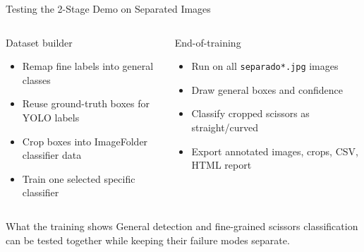 \documentclass[10pt,aspectratio=169]{beamer}
\begin{document}
\begin{frame}{Testing the 2-Stage Demo on Separated Images}
  \begin{columns}[T]
    \begin{block}{Dataset builder}
      \small
      \begin{itemize}
        \item Remap fine labels into general classes
        \item Reuse ground-truth boxes for YOLO labels
        \item Crop boxes into ImageFolder classifier data
        \item Train one selected specific classifier
      \end{itemize}
    \end{block}
    \begin{block}{End-of-training}
      \small
      \begin{itemize}
        \item Run on all \texttt{separado*.jpg} images
        \item Draw general boxes and confidence
        \item Classify cropped scissors as straight/curved
        \item Export annotated images, crops, CSV, HTML report
      \end{itemize}
    \end{block}
  \end{columns}
  \vspace{0.25cm}
  \begin{exampleblock}{What the training shows}
    \centering
    General detection and fine-grained scissors classification can be tested
    together while keeping their failure modes separate.
  \end{exampleblock}
\end{frame}
\end{document}
